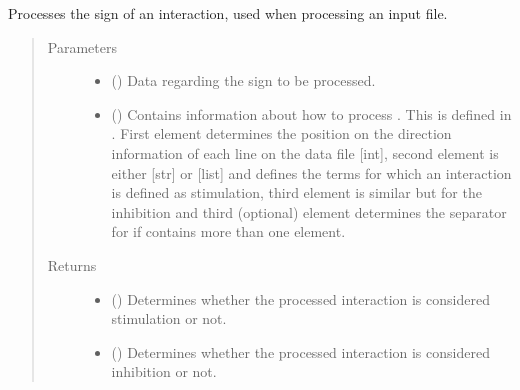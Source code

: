 \documentclass[letterpaper,10pt,english]{sphinxmanual}
\begin{document}
\begin{fulllineitems}
\begin{fulllineitems}
\label{\detokenize{main:pypath.main.PyPath.process_sign}}
Processes the sign of an interaction, used when processing an
input file.
\begin{quote}\begin{description}
\item[{Parameters}] \leavevmode\begin{itemize}
\item {} 
 () \textendash{} Data regarding the sign to be processed.

\item {} 
 () \textendash{} Contains information about how to process . This
is defined in . First element
determines the position on the direction information of each
line on the data file {[}int{]}, second element is either {[}str{]}
or {[}list{]} and defines the terms for which an interaction is
defined as stimulation, third element is similar but for the
inhibition and third (optional) element determines the
separator for  if contains more than one element.

\end{itemize}

\item[{Returns}] \leavevmode
\begin{itemize}
\item {} 
() \textendash{} Determines whether the processed interaction
is considered stimulation or not.

\item {} 
() \textendash{} Determines whether the processed interaction
is considered inhibition or not.

\end{itemize}


\end{description}\end{quote}

\end{fulllineitems}



\end{fulllineitems}
\end{document}
